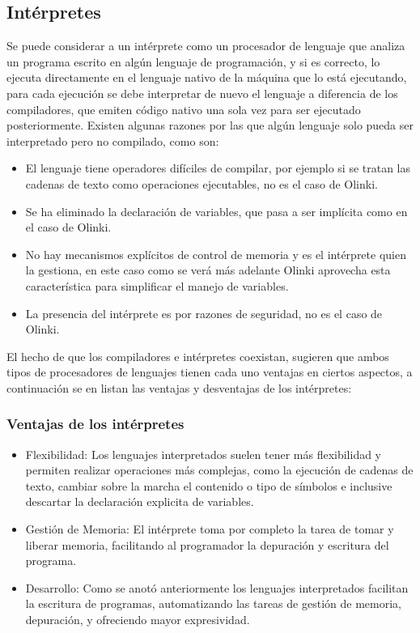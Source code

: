 \documentclass[letterpaper,10pt]{article}
\begin{document}
\subsection{Intérpretes}

Se puede considerar a un intérprete como un procesador de lenguaje que analiza un 
programa escrito en algún lenguaje de programación, y si es correcto, lo ejecuta
directamente en el lenguaje nativo de la máquina que lo está ejecutando, para cada ejecución
se debe interpretar de nuevo el lenguaje a diferencia de los compiladores, 
que emiten código nativo una sola vez para ser ejecutado posteriormente.
Existen algunas razones por las que algún lenguaje solo pueda ser interpretado
pero no compilado, como son:

\begin{itemize}
 \item El lenguaje tiene operadores difíciles de compilar, por ejemplo si se 
 tratan las cadenas de texto como operaciones ejecutables, no es el caso de Olinki.
 \item Se ha eliminado la declaración de variables, que pasa a ser implícita como en el 
 caso de Olinki.
 \item No hay mecanismos explícitos de control de memoria y es el intérprete quien la 
 gestiona, en este caso como se verá más adelante Olinki aprovecha esta característica
 para simplificar el manejo de variables.
 \item La presencia del intérprete es por razones de seguridad, no es el caso de Olinki.
\end{itemize}

El hecho de que los compiladores e intérpretes coexistan, sugieren que ambos tipos
de procesadores de lenguajes tienen cada uno ventajas en ciertos aspectos,
a continuación se en listan las ventajas y desventajas de los intérpretes:

\subsubsection{Ventajas de los intérpretes}

\begin{itemize}
 \item Flexibilidad: Los lenguajes interpretados suelen tener más flexibilidad
 y permiten realizar operaciones más complejas, como la ejecución de cadenas 
 de texto, cambiar sobre la marcha el contenido o tipo de símbolos e inclusive
 descartar la declaración explicita de variables.
 
 \item Gestión de Memoria: El intérprete toma por completo la tarea de tomar
 y liberar memoria, facilitando al programador la depuración y escritura
 del programa.
 
 \item Desarrollo: Como se anotó anteriormente los lenguajes interpretados 
 facilitan la escritura de programas, automatizando las tareas de gestión
 de memoria, depuración, y ofreciendo mayor expresividad.
 
\end{itemize}
\end{document}
